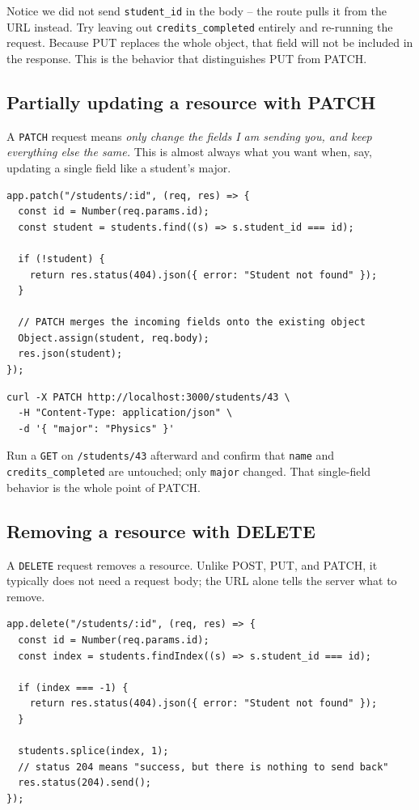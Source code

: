 Notice we did not send \texttt{student\_id} in the body -- the route
pulls it from the URL instead. Try leaving out
\texttt{credits\_completed} entirely and re-running the request. Because
PUT replaces the whole object, that field will not be included in the
response. This is the behavior that distinguishes PUT from PATCH.

\subsection{Partially updating a resource with PATCH}

A \texttt{PATCH} request means \emph{only change the fields I am
  sending you, and keep everything else the same.} This is almost always
what you want when, say, updating a single field like a student's
major.

\begin{verbatim}
app.patch("/students/:id", (req, res) => {
  const id = Number(req.params.id);
  const student = students.find((s) => s.student_id === id);
 
  if (!student) {
    return res.status(404).json({ error: "Student not found" });
  }
 
  // PATCH merges the incoming fields onto the existing object
  Object.assign(student, req.body);
  res.json(student);
});
\end{verbatim}

\begin{verbatim}
curl -X PATCH http://localhost:3000/students/43 \
  -H "Content-Type: application/json" \
  -d '{ "major": "Physics" }'
\end{verbatim}

Run a \texttt{GET} on \texttt{/students/43} afterward and confirm that
\texttt{name} and \texttt{credits\_completed} are untouched; only
\texttt{major} changed. That single-field behavior is the whole point
of PATCH.

\subsection{Removing a resource with DELETE}

A \texttt{DELETE} request removes a resource. Unlike POST, PUT, and
PATCH, it typically does not need a request body; the URL alone
tells the server what to remove.

\begin{verbatim}
app.delete("/students/:id", (req, res) => {
  const id = Number(req.params.id);
  const index = students.findIndex((s) => s.student_id === id);
 
  if (index === -1) {
    return res.status(404).json({ error: "Student not found" });
  }
 
  students.splice(index, 1);
  // status 204 means "success, but there is nothing to send back"
  res.status(204).send();
});
\end{verbatim}

